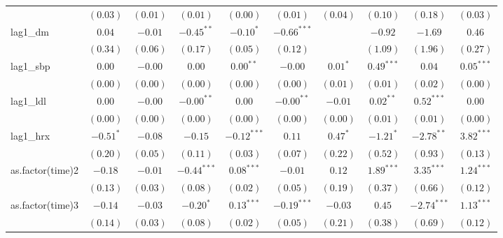 \begin{tabular}{l c c c c c c c c c}
                 & $(0.03)$      & $(0.01)$      & $(0.01)$      & $(0.00)$      & $(0.01)$      & $(0.04)$       & $(0.10)$      & $(0.18)$      & $(0.03)$       \\
lag1\_dm         & $0.04$        & $-0.01$       & $-0.45^{**}$  & $-0.10^{*}$   & $-0.66^{***}$ &                & $-0.92$       & $-1.69$       & $0.46$         \\
                 & $(0.34)$      & $(0.06)$      & $(0.17)$      & $(0.05)$      & $(0.12)$      &                & $(1.09)$      & $(1.96)$      & $(0.27)$       \\
lag1\_sbp        & $0.00$        & $-0.00$       & $0.00$        & $0.00^{**}$   & $-0.00$       & $0.01^{*}$     & $0.49^{***}$  & $0.04$        & $0.05^{***}$   \\
                 & $(0.00)$      & $(0.00)$      & $(0.00)$      & $(0.00)$      & $(0.00)$      & $(0.01)$       & $(0.01)$      & $(0.02)$      & $(0.00)$       \\
lag1\_ldl        & $0.00$        & $-0.00$       & $-0.00^{**}$  & $0.00$        & $-0.00^{**}$  & $-0.01$        & $0.02^{**}$   & $0.52^{***}$  & $0.00$         \\
                 & $(0.00)$      & $(0.00)$      & $(0.00)$      & $(0.00)$      & $(0.00)$      & $(0.00)$       & $(0.01)$      & $(0.01)$      & $(0.00)$       \\
lag1\_hrx        & $-0.51^{*}$   & $-0.08$       & $-0.15$       & $-0.12^{***}$ & $0.11$        & $0.47^{*}$     & $-1.21^{*}$   & $-2.78^{**}$  & $3.82^{***}$   \\
                 & $(0.20)$      & $(0.05)$      & $(0.11)$      & $(0.03)$      & $(0.07)$      & $(0.22)$       & $(0.52)$      & $(0.93)$      & $(0.13)$       \\
as.factor(time)2 & $-0.18$       & $-0.01$       & $-0.44^{***}$ & $0.08^{***}$  & $-0.01$       & $0.12$         & $1.89^{***}$  & $3.35^{***}$  & $1.24^{***}$   \\
                 & $(0.13)$      & $(0.03)$      & $(0.08)$      & $(0.02)$      & $(0.05)$      & $(0.19)$       & $(0.37)$      & $(0.66)$      & $(0.12)$       \\
as.factor(time)3 & $-0.14$       & $-0.03$       & $-0.20^{*}$   & $0.13^{***}$  & $-0.19^{***}$ & $-0.03$        & $0.45$        & $-2.74^{***}$ & $1.13^{***}$   \\
                 & $(0.14)$      & $(0.03)$      & $(0.08)$      & $(0.02)$      & $(0.05)$      & $(0.21)$       & $(0.38)$      & $(0.69)$      & $(0.12)$       \\

\end{tabular}
